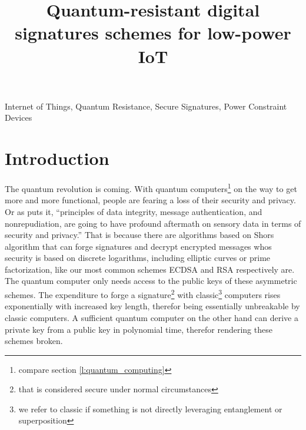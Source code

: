 \documentclass[conference]{IEEEtran}
\newcommand{\comment}[1]{}
\begin{document}
\title{Quantum-resistant digital signatures schemes for low-power IoT}

\author{
}

\maketitle

\begin{abstract}
\end{abstract}

\begin{IEEEkeywords}
Internet of Things, Quantum Resistance, Secure Signatures, Power Constraint Devices
\end{IEEEkeywords}


\section{Introduction}
\comment{ %
    „principles of data integrity, message authentication, and nonrepudiation, are going to have profound aftermath on sensory data in terms of security and privacy.“ \cite{QR_sigs}
} %

The quantum revolution is coming. With quantum computers\footnote{compare section \ref{l:quantum_computing}} on the way to get more and more functional, people are fearing a loss of their security and privacy.
Or as \cite{QR_sigs} puts it, ``principles of data integrity, message authentication, and nonrepudiation, are going to have profound aftermath on sensory data in terms of security and privacy.''
That is because there are algorithms based on Shors algorithm that can forge signatures and decrypt encrypted messages whos security is based on discrete logarithms, including elliptic curves or prime factorization, like our most common schemes ECDSA and RSA respectively are.
The quantum computer only needs access to the public keys of these asymmetric schemes.
The expenditure to forge a signature\footnote{that is considered secure under normal circumstances 
} with classic\footnote{we refer to classic if something is not directly leveraging entanglement or superposition} computers rises exponentially with increased key length, therefor being essentially unbreakable by classic computers.
A sufficient quantum computer on the other hand can derive a private key from a public key in polynomial time, therefor rendering these schemes broken.
\end{document}

